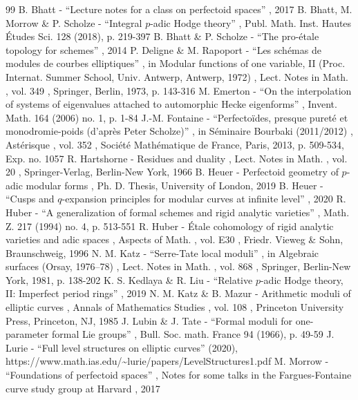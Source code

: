 \documentclass[11pt]{article}
\numberwithin{equation}{section}
\theoremstyle{definition}
\begin{document}
\begin{thebibliography}{99}
 B. Bhatt - “Lecture notes for a class on perfectoid spaces” , 2017
 B. Bhatt, M. Morrow \& P. Scholze - “Integral $p$-adic Hodge theory” , Publ. Math. Inst. Hautes Études Sci. 128 (2018), p. 219-397
 B. Bhatt \& P. Scholze - “The pro-étale topology for schemes” , 2014
 P. Deligne \& M. Rapoport - “Les schémas de modules de courbes elliptiques” , in Modular functions of one variable, II (Proc. Internat. Summer School, Univ. Antwerp, Antwerp, 1972) , Lect. Notes in Math. , vol. 349 , Springer, Berlin, 1973, p. 143-316
 M. Emerton - “On the interpolation of systems of eigenvalues attached to automorphic Hecke eigenforms” , Invent. Math. 164 (2006) no. 1, p. 1-84
 J.-M. Fontaine - “Perfectoïdes, presque pureté et monodromie-poids (d’après Peter Scholze)” , in Séminaire Bourbaki (2011/2012) , Astérisque , vol. 352 , Société Mathématique de France, Paris, 2013, p. 509-534, Exp. no. 1057
 R. Hartshorne - Residues and duality , Lect. Notes in Math. , vol. 20 , Springer-Verlag, Berlin-New York, 1966
 B. Heuer - Perfectoid geometry of $p$-adic modular forms , Ph. D. Thesis, University of London, 2019
 B. Heuer - “Cusps and $q$-expansion principles for modular curves at infinite level” , 2020
 R. Huber - “A generalization of formal schemes and rigid analytic varieties” , Math. Z. 217 (1994) no. 4, p. 513-551
 R. Huber - Étale cohomology of rigid analytic varieties and adic spaces , Aspects of Math. , vol. E30 , Friedr. Vieweg \& Sohn, Braunschweig, 1996
 N. M. Katz - “Serre-Tate local moduli” , in Algebraic surfaces (Orsay, 1976–78) , Lect. Notes in Math. , vol. 868 , Springer, Berlin-New York, 1981, p. 138-202
 K. S. Kedlaya \& R. Liu - “Relative $p$-adic Hodge theory, II: Imperfect period rings” , 2019
 N. M. Katz \& B. Mazur - Arithmetic moduli of elliptic curves , Annals of Mathematics Studies , vol. 108 , Princeton University Press, Princeton, NJ, 1985
 J. Lubin \& J. Tate - “Formal moduli for one-parameter formal Lie groups” , Bull. Soc. math. France 94 (1966), p. 49-59
 J. Lurie - “Full level structures on elliptic curves” (2020), https://www.math.ias.edu/\textasciitilde{}lurie/papers/LevelStructures1.pdf
 M. Morrow - “Foundations of perfectoid spaces” , Notes for some talks in the Fargues-Fontaine curve study group at Harvard , 2017

\end{thebibliography}
\end{document}
